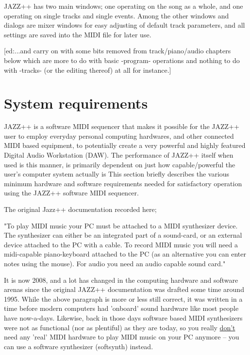 \documentclass[letterpaper]{report}
\begin{document}
JAZZ++ has two main windows; one
operating on the song as a whole, and one operating on single tracks and
single events. Among the other windows and dialogs are mixer windows for easy
adjusting of default track parameters, and all settings are saved into the
MIDI file for later use.


[ed:...and carry on with some bits removed from track/piano/audio chapters
 below which are more to do with basic -program- operations and nothing
to do with -tracks- (or the editing thereof) at all for instance.] 

\section{System requirements}\label{requirements}

JAZZ++ is a software MIDI sequencer that makes it possible for the JAZZ++
user to employ everyday personal computing hardwares, and other connected MIDI
based equipment, to potentially create a very powerful and highly featured
Digital Audio Workstation (DAW). The performance of JAZZ++ itself when used
is this manner, is primarily dependent on just how capable/powerful the user's
computer system actually is  This section briefly describes the various minimum
hardware and software requirements needed for satisfactory operation using the
JAZZ++ software MIDI sequencer.

The original Jazz++ documentation recorded here;

"To play MIDI music your PC must be attached to a MIDI synthesizer device. The
synthesizer can either be an integrated part of a sound-card, or an external
device attached to the PC with a cable. To record MIDI music you will need a
midi-capable piano-keyboard attached to the PC (as an alternative you can enter
notes using the mouse). For audio you need an audio capable sound card."

It is now 2008, and a lot has changed in the computing hardware and software
arenas since the original JAZZ++ documentation was drafted some time around
1995. While the above paragraph is more or less still correct, it was written in
a time before modern computers had 'onboard' sound hardware like most people
have now-a-days. Likewise, back in those days software based MIDI synthesizers
were not as functional (nor as plentiful) as they are today, so you really
\underline{don't} need any 'real' MIDI hardware to play MIDI music on your PC
anymore -- you can use a software synthesizer (softsynth) instead.
\end{document}
